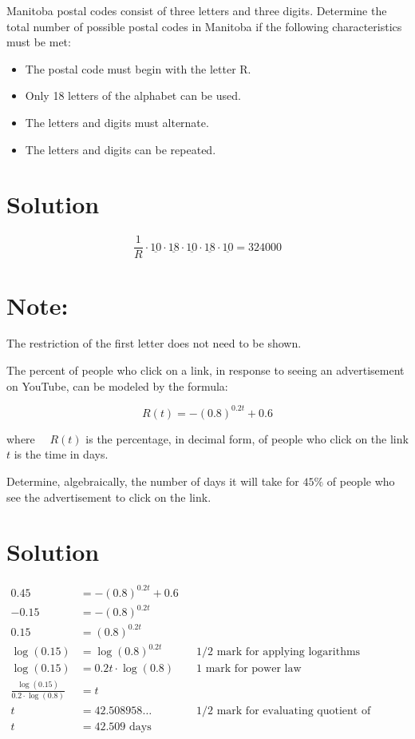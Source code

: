 \documentclass[10pt]{article}
\begin{document}
Manitoba postal codes consist of three letters and three digits. Determine the total number of possible postal codes in Manitoba if the following characteristics must be met:

\begin{itemize}
  \item The postal code must begin with the letter R.
  \item Only 18 letters of the alphabet can be used.
  \item The letters and digits must alternate.
  \item The letters and digits can be repeated.
\end{itemize}

\section*{Solution}
$$
\frac{1}{R} \cdot \underline{10} \cdot \underline{18} \cdot \underline{10} \cdot \underline{18} \cdot \underline{10}=324000
$$

\section*{Note:}
The restriction of the first letter does not need to be shown.

The percent of people who click on a link, in response to seeing an advertisement on YouTube, can be modeled by the formula:

$$
R(t)=-(0.8)^{0.2 t}+0.6
$$

where $\quad R(t)$ is the percentage, in decimal form, of people who click on the link $t$ is the time in days.

Determine, algebraically, the number of days it will take for $45 \%$ of people who see the advertisement to click on the link.

\section*{Solution}
$$
\begin{aligned}
0.45 & =-(0.8)^{0.2 t}+0.6 & & \\
-0.15 & =-(0.8)^{0.2 t} & & \\
0.15 & =(0.8)^{0.2 t} & & \\
\log (0.15) & =\log (0.8)^{0.2 t} & & 1 / 2 \text { mark for applying logarithms } \\
\log (0.15) & =0.2 t \cdot \log (0.8) & & 1 \text { mark for power law } \\
\frac{\log (0.15)}{0.2 \cdot \log (0.8)} & =t & & \\
t & =42.508958 \ldots & & 1 / 2 \text { mark for evaluating quotient of logarithms } \\
t & =42.509 \text { days } & &
\end{aligned}
$$
\end{document}
